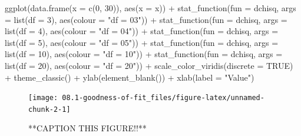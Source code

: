 \documentclass[
]{book}
\newenvironment{Shaded}{\begin{snugshade}}{\end{snugshade}}
\newcommand{\AttributeTok}[1]{\textcolor[rgb]{0.77,0.63,0.00}{#1}}
\newcommand{\ConstantTok}[1]{\textcolor[rgb]{0.00,0.00,0.00}{#1}}
\newcommand{\DecValTok}[1]{\textcolor[rgb]{0.00,0.00,0.81}{#1}}
\newcommand{\FunctionTok}[1]{\textcolor[rgb]{0.00,0.00,0.00}{#1}}
\newcommand{\NormalTok}[1]{#1}
\newcommand{\SpecialCharTok}[1]{\textcolor[rgb]{0.00,0.00,0.00}{#1}}
\newcommand{\StringTok}[1]{\textcolor[rgb]{0.31,0.60,0.02}{#1}}
\begin{document}
\begin{Shaded}
\begin{Highlighting}[]
\FunctionTok{ggplot}\NormalTok{(}\FunctionTok{data.frame}\NormalTok{(}\AttributeTok{x =} \FunctionTok{c}\NormalTok{(}\DecValTok{0}\NormalTok{, }\DecValTok{30}\NormalTok{)), }\FunctionTok{aes}\NormalTok{(}\AttributeTok{x =}\NormalTok{ x)) }\SpecialCharTok{+}
  \FunctionTok{stat\_function}\NormalTok{(}\AttributeTok{fun =}\NormalTok{ dchisq, }\AttributeTok{args =} \FunctionTok{list}\NormalTok{(}\AttributeTok{df =} \DecValTok{3}\NormalTok{), }\FunctionTok{aes}\NormalTok{(}\AttributeTok{colour =} \StringTok{"df = 03"}\NormalTok{)) }\SpecialCharTok{+}
  \FunctionTok{stat\_function}\NormalTok{(}\AttributeTok{fun =}\NormalTok{ dchisq, }\AttributeTok{args =} \FunctionTok{list}\NormalTok{(}\AttributeTok{df =} \DecValTok{4}\NormalTok{), }\FunctionTok{aes}\NormalTok{(}\AttributeTok{colour =} \StringTok{"df = 04"}\NormalTok{)) }\SpecialCharTok{+}
  \FunctionTok{stat\_function}\NormalTok{(}\AttributeTok{fun =}\NormalTok{ dchisq, }\AttributeTok{args =} \FunctionTok{list}\NormalTok{(}\AttributeTok{df =} \DecValTok{5}\NormalTok{), }\FunctionTok{aes}\NormalTok{(}\AttributeTok{colour =} \StringTok{"df = 05"}\NormalTok{)) }\SpecialCharTok{+}
  \FunctionTok{stat\_function}\NormalTok{(}\AttributeTok{fun =}\NormalTok{ dchisq, }\AttributeTok{args =} \FunctionTok{list}\NormalTok{(}\AttributeTok{df =} \DecValTok{10}\NormalTok{), }\FunctionTok{aes}\NormalTok{(}\AttributeTok{colour =} \StringTok{"df = 10"}\NormalTok{)) }\SpecialCharTok{+}
  \FunctionTok{stat\_function}\NormalTok{(}\AttributeTok{fun =}\NormalTok{ dchisq, }\AttributeTok{args =} \FunctionTok{list}\NormalTok{(}\AttributeTok{df =} \DecValTok{20}\NormalTok{), }\FunctionTok{aes}\NormalTok{(}\AttributeTok{colour =} \StringTok{"df = 20"}\NormalTok{)) }\SpecialCharTok{+}
  \FunctionTok{scale\_color\_viridis}\NormalTok{(}\AttributeTok{discrete =} \ConstantTok{TRUE}\NormalTok{) }\SpecialCharTok{+}
  \FunctionTok{theme\_classic}\NormalTok{() }\SpecialCharTok{+}
  \FunctionTok{ylab}\NormalTok{(}\FunctionTok{element\_blank}\NormalTok{()) }\SpecialCharTok{+}
  \FunctionTok{xlab}\NormalTok{(}\AttributeTok{label =} \StringTok{"Value"}\NormalTok{)}
\end{Highlighting}
\end{Shaded}

\begin{figure}

{\centering \texttt{[image: 08.1-goodness-of-fit\_files/figure-latex/unnamed-chunk-2-1]} 

}

\caption{**CAPTION THIS FIGURE!!**}\label{fig:unnamed-chunk-2}
\end{figure}
\end{document}
